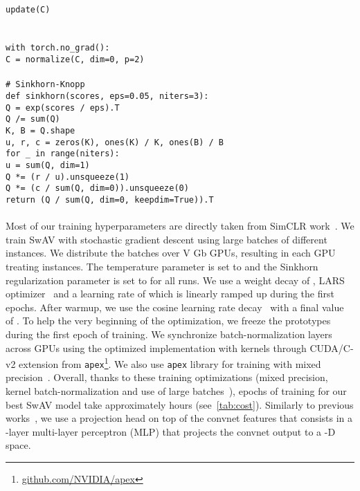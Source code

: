 \documentclass{article}
\def\OURS{SwAV\xspace}
\newcommand{\code}[1]{\texttt{#1}}
\newcommand{\com}[1]{{\color{CadetBlue}\texttt{#1}}}
\begin{document}
\\
\tab \code{update(C)}
\\
\\
\tab \com{\# normalize prototypes}
\\
\tab \code{with torch.no\_grad():}
\\
\tab \tab \code{C = normalize(C, dim=0, p=2)}
\\
\\
\com{\# Sinkhorn-Knopp}
\\
\code{def sinkhorn(scores, eps=0.05, niters=3):}
\\
\tab \code{Q = exp(scores / eps).T}
\\
\tab \code{Q /= sum(Q)}
\\
\tab \code{K, B = Q.shape}
\\
\tab \code{u, r, c = zeros(K), ones(K) / K, ones(B) / B}
\\
\tab \code{for \_ in range(niters):}
\\
\tab \tab \code{u = sum(Q, dim=1)}
\\
\tab \tab \code{Q *= (r / u).unsqueeze(1)}
\\
\tab \tab \code{Q *= (c / sum(Q, dim=0)).unsqueeze(0)}
\\
\tab \code{return (Q / sum(Q, dim=0, keepdim=True)).T}
\\
\\
Most of our training hyperparameters are directly taken from SimCLR work~\cite{chen2020simple}.
We train \OURS with stochastic gradient descent using large batches of  different instances.
We distribute the batches over  V Gb GPUs, resulting in each GPU treating  instances.
The temperature parameter  is set to  and the Sinkhorn regularization parameter  is set to  for all runs.
We use a weight decay of , LARS optimizer~\cite{you2017large} and a learning rate of  which is linearly ramped up during the first  epochs.
After warmup, we use the cosine learning rate decay~\cite{loshchilov2016sgdr,misra2019self} with a final value of .
To help the very beginning of the optimization, we freeze the prototypes during the first epoch of training.
We synchronize batch-normalization layers across GPUs using the optimized implementation with kernels through CUDA/C-v2 extension from \texttt{apex}\footnote{\scriptsize\url{github.com/NVIDIA/apex}}.
We also use \texttt{apex} library for training with mixed precision~\cite{micikevicius2017mixed}.
Overall, thanks to these training optimizations (mixed precision, kernel batch-normalization and use of large batches~\cite{goyal2017accurate}),  epochs of training for our best \OURS model take approximately  hours (see~\cref{tab:cost}).
Similarly to previous works~\cite{chen2020simple,chen2020improved,li2020prototypical}, we use a projection head on top of the convnet features that consists in a -layer multi-layer perceptron (MLP) that projects the convnet output to a -D space.
\end{document}

